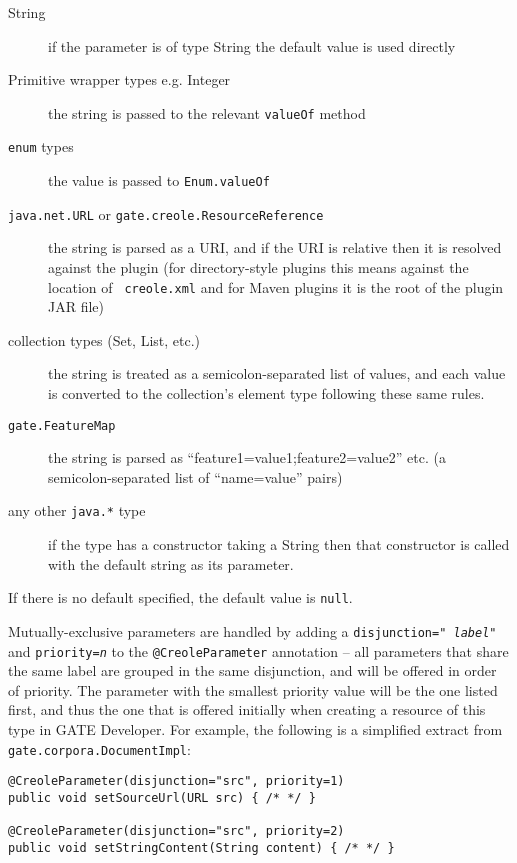 \begin{description}
\item[String] if the parameter is of type String the default value is used
  directly
\item[Primitive wrapper types e.g. Integer] the string is passed to the
  relevant {\tt valueOf} method
\item[{\tt enum} types] the value is passed to {\tt Enum.valueOf}
\item[{\tt java.net.URL} or {\tt gate.creole.ResourceReference}] the string is
  parsed as a URI, and if the URI is relative then it is resolved against the
  plugin (for directory-style plugins this means against the location of {\tt
  creole.xml} and for Maven plugins it is the root of the plugin JAR file)
\item[collection types (Set, List, etc.)] the string is treated as a
  semicolon-separated list of values, and each value is converted to the
  collection's element type following these same rules.
\item[{\tt gate.FeatureMap}] the string is parsed as
  ``feature1=value1;feature2=value2'' etc. (a semicolon-separated list of
  ``name=value'' pairs)
\item[any other {\tt java.*} type] if the type has a constructor taking a
  String then that constructor is called with the default string as its
  parameter.
\end{description}

If there is no default specified, the default value is {\tt null}.

Mutually-exclusive parameters are handled by adding a {\tt disjunction="{\it
label}"} and {\tt priority={\it n}} to the \verb|@CreoleParameter| annotation
-- all parameters that share the same label are grouped in the same
disjunction, and will be offered in order of priority.  The parameter with the
smallest priority value will be the one listed first, and thus the one that is
offered initially when creating a resource of this type in GATE Developer.  For
example, the following is a simplified extract from
{\tt gate.corpora.DocumentImpl}:

\begin{lstlisting}
@CreoleParameter(disjunction="src", priority=1)
public void setSourceUrl(URL src) { /* */ }

@CreoleParameter(disjunction="src", priority=2)
public void setStringContent(String content) { /* */ }
\end{lstlisting}

